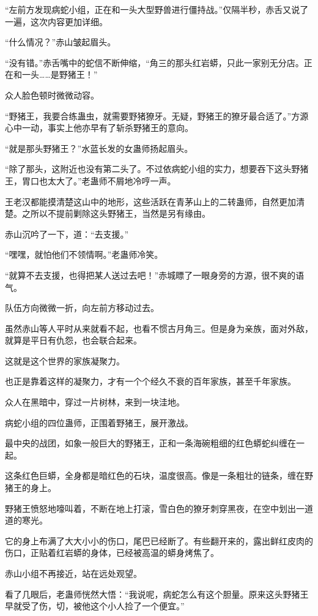 
\begin{this_body}

“左前方发现病蛇小组，正在和一头大型野兽进行僵持战。”仅隔半秒，赤舌又说了一遍，这次内容更加详细。

“什么情况？”赤山皱起眉头。

“没有错。”赤舌嘴中的蛇信不断伸缩，“角三的那头红岩蟒，只此一家别无分店。正在和一头……是野猪王！”

众人脸色顿时微微动容。

“野猪王，我要合练蛊虫，就需要野猪獠牙。无疑，野猪王的獠牙最合适了。”方源心中一动，事实上他亦早有了斩杀野猪王的意向。

“就是那头野猪王？”水蓝长发的女蛊师扬起眉头。

“除了那头，这附近也没有第二头了。不过依病蛇小组的实力，想要吞下这头野猪王，胃口也太大了。”老蛊师不屑地冷哼一声。

王老汉都能摸清楚这山中的地形，这些活跃在青茅山上的二转蛊师，自然更加清楚。之所以不提前剿除这头野猪王，当然是另有缘由。

赤山沉吟了一下，道：“去支援。”

“嘿嘿，就怕他们不领情啊。”老蛊师冷笑。

“就算不去支援，也得把某人送过去吧！”赤城瞟了一眼身旁的方源，很不爽的语气。

队伍方向微微一折，向左前方移动过去。

虽然赤山等人平时从来就看不起，也看不惯古月角三。但是身为亲族，面对外敌，就算是平日有仇怨，也会联合起来。

这就是这个世界的家族凝聚力。

也正是靠着这样的凝聚力，才有一个个经久不衰的百年家族，甚至千年家族。

众人在黑暗中，穿过一片树林，来到一块洼地。

病蛇小组的四位蛊师，正围着野猪王，展开激战。

最中央的战团，如象一般巨大的野猪王，正和一条海碗粗细的红色蟒蛇纠缠在一起。

这条红色巨蟒，全身都是暗红色的石块，温度很高。像是一条粗壮的链条，缠在野猪王的身上。

野猪王愤怒地嚎叫着，不断在地上打滚，雪白色的獠牙刺穿黑夜，在空中划出一道道的寒光。

它的身上布满了大大小小的伤口，尾巴已经断了。有些翻开来的，露出鲜红皮肉的伤口，正贴着红岩蟒的身体，已经被高温的蟒身烤焦了。

赤山小组不再接近，站在远处观望。

看了几眼后，老蛊师恍然大悟：“我说呢，病蛇怎么有这个胆量。原来这头野猪王早就受了伤，切，被他这个小人捡了一个便宜。”


\end{this_body}
